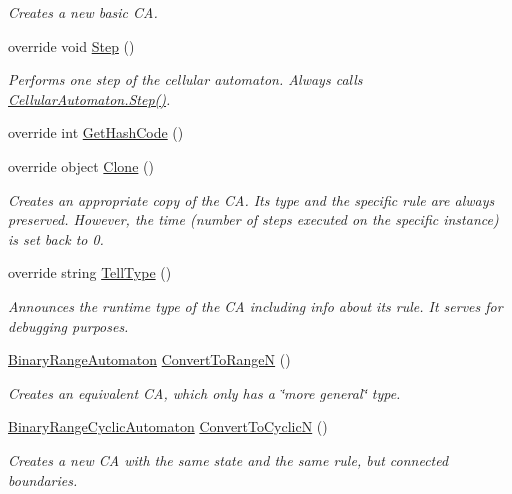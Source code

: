 \begin{DoxyCompactItemize}
\begin{DoxyCompactList}\small\item\em Creates a new basic C\+A. \end{DoxyCompactList}\item 
override void \hyperlink{class_cellular_1_1_elementary_automaton_adae7c322e4c7cd00cd0534a23d1abfa4}{Step} ()
\begin{DoxyCompactList}\small\item\em Performs one step of the cellular automaton. Always calls {\ttfamily \hyperlink{class_cellular_1_1_cellular_automaton_aa70848d58015575974bc875ac5a89ae7}{Cellular\+Automaton.\+Step()}}. \end{DoxyCompactList}\item 
override int \hyperlink{class_cellular_1_1_elementary_automaton_abaa1bb77264571ec245155f079fe1ff0}{Get\+Hash\+Code} ()
\item 
override object \hyperlink{class_cellular_1_1_elementary_automaton_ada4ddee98167e8f4f4b6dea1f7563b47}{Clone} ()
\begin{DoxyCompactList}\small\item\em Creates an appropriate copy of the C\+A. Its type and the specific rule are always preserved. However, the time (number of steps executed on the specific instance) is set back to 0. \end{DoxyCompactList}\item 
override string \hyperlink{class_cellular_1_1_elementary_automaton_a812677139d560e2c600226361b785995}{Tell\+Type} ()
\begin{DoxyCompactList}\small\item\em Announces the runtime type of the C\+A including info about its rule. It serves for debugging purposes. \end{DoxyCompactList}\item 
\hyperlink{class_cellular_1_1_binary_range_automaton}{Binary\+Range\+Automaton} \hyperlink{class_cellular_1_1_elementary_automaton_aef244148e0234495c1f0afaef7f22e28}{Convert\+To\+Range\+N} ()
\begin{DoxyCompactList}\small\item\em Creates an equivalent C\+A, which only has a \char`\"{}more general\char`\"{} type. \end{DoxyCompactList}\item 
\hyperlink{class_cellular_1_1_binary_range_cyclic_automaton}{Binary\+Range\+Cyclic\+Automaton} \hyperlink{class_cellular_1_1_elementary_automaton_a8876a09ba28af93b0e5163eef3cbe79e}{Convert\+To\+Cyclic\+N} ()
\begin{DoxyCompactList}\small\item\em Creates a new C\+A with the same state and the same rule, but connected boundaries. \end{DoxyCompactList}\end{DoxyCompactItemize}

